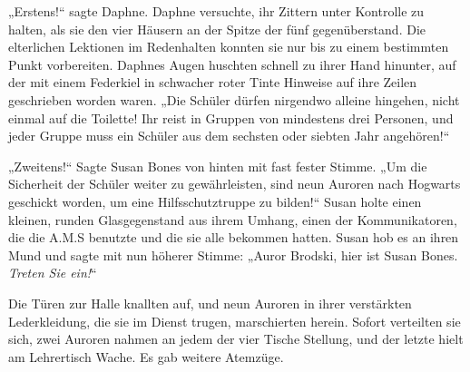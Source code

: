 \later

„Erstens!“ sagte Daphne. Daphne versuchte, ihr Zittern unter Kontrolle zu halten, als sie den vier Häusern an der Spitze der fünf gegenüberstand. Die elterlichen Lektionen im Redenhalten konnten sie nur bis zu einem bestimmten Punkt vorbereiten. Daphnes Augen huschten schnell zu ihrer Hand hinunter, auf der mit einem Federkiel in schwacher roter Tinte Hinweise auf ihre Zeilen geschrieben worden waren.
„Die Schüler dürfen nirgendwo alleine hingehen, nicht einmal auf die Toilette! Ihr reist in Gruppen von mindestens drei Personen, und jeder Gruppe muss ein Schüler aus dem sechsten oder siebten Jahr angehören!“

„Zweitens!“ Sagte Susan Bones von hinten mit fast fester Stimme.
„Um die Sicherheit der Schüler weiter zu gewährleisten, sind neun Auroren nach Hogwarts geschickt worden, um eine Hilfsschutztruppe zu bilden!“
Susan holte einen kleinen, runden Glasgegenstand aus ihrem Umhang, einen der Kommunikatoren, die die A.M.S benutzte und die sie alle bekommen hatten. Susan hob es an ihren Mund und sagte mit nun höherer Stimme:
„Auror Brodski, hier ist Susan Bones. \emph{Treten Sie ein!}“

Die Türen zur Halle knallten auf, und neun Auroren in ihrer verstärkten Lederkleidung, die sie im Dienst trugen, marschierten herein. Sofort verteilten sie sich, zwei Auroren nahmen an jedem der vier Tische Stellung, und der letzte hielt am Lehrertisch Wache. Es gab weitere Atemzüge.

